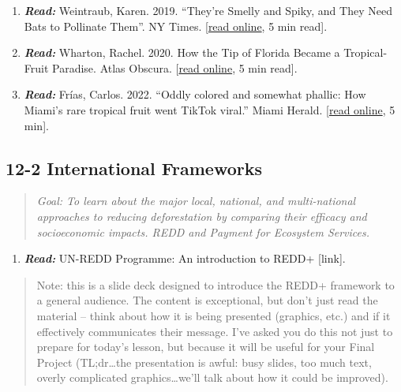 \documentclass[
  10pt,
  letterpaper,
  oneside,
  open=any]{scrbook}
\providecommand{\tightlist}{%
  \setlength{\itemsep}{0pt}\setlength{\parskip}{0pt}}\usepackage{longtable,booktabs,array}
\begin{document}
\begin{enumerate}
\def\labelenumi{\arabic{enumi}.}
\item
  \textbf{\emph{Read:}} Weintraub, Karen. 2019. ``They're Smelly and
  Spiky, and They Need Bats to Pollinate Them''. NY Times.
  {[}\href{https://www.nytimes.com/2019/12/04/science/bats-durians-indonesia.html}{read
  online}, 5 min read{]}.
\item
  \textbf{\emph{Read:}} Wharton, Rachel. 2020. How the Tip of Florida
  Became a Tropical-Fruit Paradise. Atlas Obscura.
  {[}\href{https://www.atlasobscura.com/articles/tropical-fruit-farms-in-united-states}{read
  online}, 5 min read{]}.
\item
  \textbf{\emph{Read:}} Frías, Carlos. 2022. ``Oddly colored and
  somewhat phallic: How Miami's rare tropical fruit went TikTok viral.''
  Miami Herald.
  {[}\href{https://www.miamiherald.com/miami-com/restaurants/article263608093.html\#storylink=cpyhttps://www.miamiherald.com/miami-com/restaurants/article263608093.html}{read
  online}, 5 min{]}.
\end{enumerate}

\subsection*{12-2 International
Frameworks}\label{international-frameworks}

\begin{quote}
\emph{Goal: To learn about the major local, national, and multi-national
approaches to reducing deforestation by comparing their efficacy and
socioeconomic impacts. REDD and Payment for Ecosystem Services.}
\end{quote}

\begin{enumerate}
\def\labelenumi{\arabic{enumi}.}
\tightlist
\item
  \textbf{\emph{Read:}} UN-REDD Programme: An introduction to REDD+
  {[}link{]}.
\end{enumerate}

\begin{quote}
Note: this is a slide deck designed to introduce the REDD+ framework to
a general audience. The content is exceptional, but don't just read the
material -- think about how it is being presented (graphics, etc.) and
if it effectively communicates their message. I've asked you do this not
just to prepare for today's lesson, but because it will be useful for
your Final Project (TL;dr\ldots the presentation is awful: busy slides,
too much text, overly complicated graphics\ldots we'll talk about how it
could be improved).
\end{quote}
\end{document}
